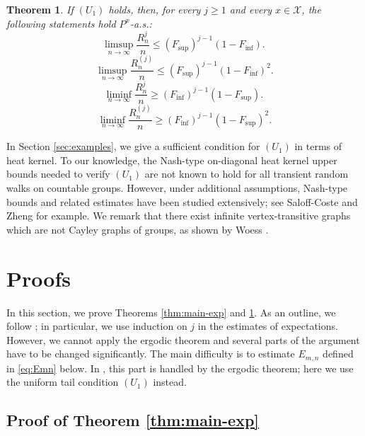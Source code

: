 \documentclass[10pt,a4paper]{amsart}
\newtheorem{Thm}{Theorem}[section]
\begin{document}
\begin{Thm}\label{thm:main-SLLN}
If $(U_1)$ holds, then, for every $j \ge 1$ and every $x \in \mathcal{X}$, 
the following statements hold $P^x$-a.s.: 
\begin{equation}\label{eq:upper-SLLN-1}
\limsup_{n \to \infty} \frac{R_n^j}{n}  \le (F_{\sup})^{j-1} (1-F_{\inf}). \ 
\end{equation}
\begin{equation}\label{eq:upper-SLLN-2}
\limsup_{n \to \infty} \frac{R_n^{(j)}}{n}  \le (F_{\sup})^{j-1} (1-F_{\inf})^2. 
\end{equation} 
\begin{equation}\label{eq:lower-SLLN-1}
\liminf_{n \to \infty} \frac{R_n^j}{n}  \ge (F_{\inf})^{j-1} (1-F_{\sup}). \ 
\end{equation}
\begin{equation}\label{eq:lower-SLLN-2}
\liminf_{n \to \infty} \frac{R_n^{(j)}}{n}  \ge (F_{\inf})^{j-1} (1-F_{\sup})^2. 
\end{equation} 
\end{Thm}

In Section \ref{sec:examples}, we give a sufficient condition for $(U_1)$ in terms of heat kernel. 
To our knowledge, the Nash-type on-diagonal heat kernel upper bounds needed to verify $(U_1)$ are not known to hold for all transient random walks on countable groups.
However, under additional assumptions, Nash-type bounds and related estimates have been studied extensively; see Saloff-Coste and Zheng  \cite{SCZ2016} for example. 
We remark that there exist infinite vertex-transitive graphs which are not Cayley graphs of groups, as shown by Woess \cite{Woess2013}. 

\section{Proofs}

In this section, we prove Theorems \ref{thm:main-exp} and \ref{thm:main-SLLN}. 
As an outline, we follow \cite{Pitt1974}; in particular, we use induction on $j$ in the estimates of expectations. 
However, we cannot apply the ergodic theorem and several parts of the argument have to be changed significantly. 
The main difficulty is to estimate $E_{m,n}$ defined in \eqref{eq:Emn} below.
In \cite{Pitt1974},  this part is handled by the ergodic theorem; here we use the uniform tail condition $(U_1)$ instead. 

\subsection{Proof of Theorem \ref{thm:main-exp}} 
\end{document}
